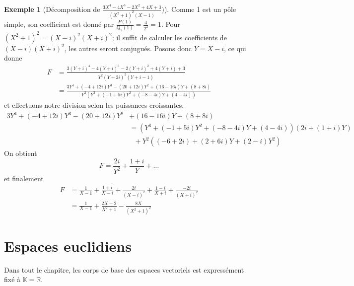 \documentclass[french]{book}
\newcommand{\R}{\mathbb{R}}
\newcommand{\K}{\mathbb{K}}
\theoremstyle{plain}
\theoremstyle{definition}
\newtheorem{exa}{Exemple}[chapter]
\theoremstyle{remark}
\begin{document}
\begin{exa}[Décomposition de $\displaystyle\frac{3X^4-4X^3-2X^2+4X+3}{(X^2+1)^2(X-1)})$]
	Comme 1 est un pôle simple, son coefficient est donné par $\displaystyle\frac{P(1)}{Q_2(1)}=\frac{4}{2^2}=1$. Pour $(X^2+1)^2=(X-i)^2(X+i)^2$; il suffit de calculer les coefficients de $(X-i)(X+i)^2$, les autres seront conjugués. Posons donc $Y=X-i$, ce qui donne \begin{align*}
		F&=\frac{3(Y+i)^4-4(Y+i)^3-2(Y+i)^2+4(Y+i)+3}{Y^2(Y+2i)^2(Y+i-1)}\\
		&=\frac{3Y^4+(-4+12i)Y^3-(20+12i)Y^2+(16-16i)Y+(8+8i)}{Y^2(Y^3+(-1+5i)Y^2+(-8-4i)Y+(4-4i))}
	\end{align*}
	et effectuons notre division selon les puissances croissantes.
	\begin{align*}
		3Y^4 + (-4+12i)Y^3 - (20+12i)Y^2 &+ (16-16i)Y + (8+8i)\\&= (Y^3 + (-1+5i)Y^2 + (-8-4i)Y + (4-4i))(2i + (1+i)Y)\\ &\ \ \ + Y^2((-6+2i) + (2+6i)Y + (2-i)Y^2)
	\end{align*}
	On obtient $$F = \frac{2i}{Y^2} + \frac{1+i}{Y} + \ldots$$ et finalement
	\begin{align*}
		F &= \frac{1}{X-1} + \frac{1+i}{X-i} + \frac{2i}{(X-i)^2} + \frac{1-i}{X+i} + \frac{-2i}{(X+i)^2} \\
		&= \frac{1}{X-1} + \frac{2X-2}{X^2+1} - \frac{8X}{(X^2+1)^2}
	\end{align*}
\end{exa}




\newpage
\chapter{Espaces euclidiens}
Dans tout le chapitre, les corps de base des espaces vectoriels est expressément fixé à $\K=\R$.
\end{document}
